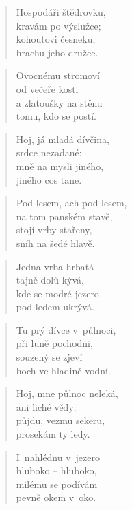 \begin{verse}
Hospodáři štědrovku, \\
kravám po výslužce; \\
kohoutovi česneku, \\
hrachu jeho družce.
\end{verse}

\begin{verse}
Ovocnému stromoví \\
od večeře kosti \\
a zlatoušky na stěnu \\
tomu, kdo se postí.
\end{verse}

\begin{verse}
Hoj, já mladá dívčina, \\
srdce nezadané: \\
mně na mysli jiného, \\
jiného cos tane.
\end{verse}

\begin{verse}
Pod lesem, ach pod lesem, \\
na tom panském stavě, \\
stojí vrby stařeny, \\
sníh na šedé hlavě.
\end{verse}

\begin{verse}
Jedna vrba hrbatá \\
tajně dolů kývá, \\
kde se modré jezero \\
pod ledem ukrývá.
\end{verse}

\begin{verse}
Tu prý dívce v~půlnoci, \\
při luně pochodni, \\
souzený se zjeví \\
hoch ve hladině vodní.
\end{verse}

\begin{verse}
Hoj, mne půlnoc neleká, \\
ani liché vědy: \\
půjdu, vezmu sekeru, \\
prosekám ty ledy.
\end{verse}

\begin{verse}
I~nahlédnu v~jezero \\
hluboko -- hluboko, \\
milému se podívám \\
pevně okem v~oko.
\end{verse}

